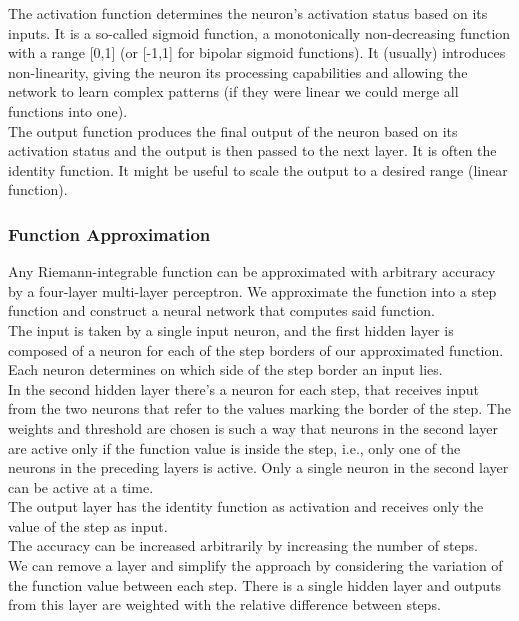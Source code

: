 \documentclass{article}
\begin{document}
	The activation function determines the neuron's activation status based on its inputs. It is a so-called sigmoid function, a monotonically non-decreasing function with a range [0,1] (or [-1,1] for bipolar sigmoid functions). It (usually) introduces non-linearity, giving the neuron its processing capabilities and allowing the network to learn complex patterns (if they were linear we could merge all functions into one).\\
	
	The output function produces the final output of the neuron based on its activation status and the output is then passed to the next layer. It is often the identity function. It might be useful to scale the output to a desired range (linear function).\\
	
	\subsubsection{Function Approximation}
	Any Riemann-integrable function can be approximated with arbitrary accuracy by a four-layer multi-layer perceptron. We approximate the function into a step function and construct a neural network that computes said function.\\
	
	The input is taken by a single input neuron, and the first hidden layer is composed of a neuron for each of the step borders of our approximated function. Each neuron determines on which side of the step border an input lies.\\
	In the second hidden layer there's a neuron for each step, that receives input from the two neurons that refer to the values marking the border of the step. The weights and threshold are chosen is such a way that neurons in the second layer are active only if the function value is inside the step, i.e., only one of the neurons in the preceding layers is active. Only a single neuron in the second layer can be active at a time.\\
	The output layer has the identity function as activation and receives only the value of the step as input.\\
	
	The accuracy can be increased arbitrarily by increasing the number of steps.\\
	
	We can remove a layer and simplify the approach by considering the variation of the function value between each step. There is a single hidden layer and outputs from this layer are weighted with the relative difference between steps.\\
	
\end{document}
